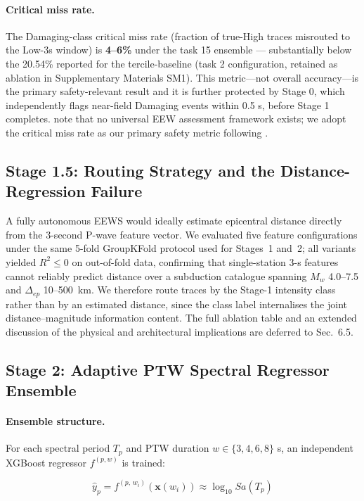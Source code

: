 \documentclass[10pt]{article}
\begin{document}
\paragraph{Critical miss rate.} The Damaging-class critical miss rate (fraction of true-High traces misrouted to the Low-3s window) is \textbf{4--6\%} under the task 15 ensemble --- substantially below the 20.54\% reported for the tercile-baseline (task 2 configuration, retained as ablation in Supplementary Materials SM1). This metric---not overall accuracy---is the primary safety-relevant result and it is further protected by Stage 0, which independently flags near-field Damaging events within 0.5 s, before Stage 1 completes. \citet{ref60} note that no universal EEW assessment framework exists; we adopt the critical miss rate as our primary safety metric following \citet{ref19}.


\subsection{Stage 1.5: Routing Strategy and the Distance-Regression Failure}

A fully autonomous EEWS would ideally estimate epicentral distance directly from the 3-second P-wave feature vector. We evaluated five feature configurations under the same 5-fold GroupKFold protocol used for Stages~1 and~2; all variants yielded $R^2 \leq 0$ on out-of-fold data, confirming that single-station 3-s features cannot reliably predict distance over a subduction catalogue spanning $M_w$ 4.0--7.5 and $\Delta_{ep}$ 10--500~km. We therefore route traces by the Stage-1 intensity class rather than by an estimated distance, since the class label internalises the joint distance--magnitude information content. The full ablation table and an extended discussion of the physical and architectural implications are deferred to Sec.~6.5.

\subsection{Stage 2: Adaptive PTW Spectral Regressor Ensemble}

\paragraph{Ensemble structure.} For each spectral period \(T_p\) and PTW duration \(w \in \{3, 4, 6, 8\}\) s, an independent XGBoost regressor \(f^{(p,w)}\) is trained:

\[\hat{y}_{p} = f^{(p,\,w_i)}\!\left(\mathbf{x}(w_i)\right) \approx \log_{10} Sa(T_p)\]
\end{document}
